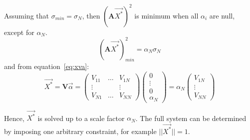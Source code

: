 \begin{algorithm}[!ht]
\begin{algorithmic}[1]
      \STATE Assuming that \(\sigma_{min} = \sigma_N\), then \((\textbf{A}\overrightarrow{X^*})^2\) is minimum when all $\alpha_i$ are null, except for $\alpha_N$.
      \begin{equation}
          (\textbf{A} \overrightarrow{X^*})_{min}^2 = \alpha_N \sigma_N
      \end{equation}
      and from equation~\ref{eq:xva}:
      \begin{equation}
          \overrightarrow{X^*} = 
          \textbf{V} \overrightarrow{\alpha} 
          = \begin{pmatrix} V_{11} & \dots & V_{1N} \\
           \vdots &  & \vdots \\
          V_{N1} & \dots & V_{NN}\end{pmatrix} \begin{pmatrix}0 \\ \vdots \\0 \\\alpha_N\end{pmatrix} 
          = \alpha_N \begin{pmatrix}V_{1N} \\ \vdots \\V_{NN}\end{pmatrix} 
      \end{equation} 
  
      \STATE Hence, $\overrightarrow{X^*}$ is solved up to a scale factor $\alpha_N$. The full system can be determined by imposing one arbitrary constraint, for example $||\overrightarrow{X^*}||=1$. 
  \end{algorithmic}
\end{algorithm}


